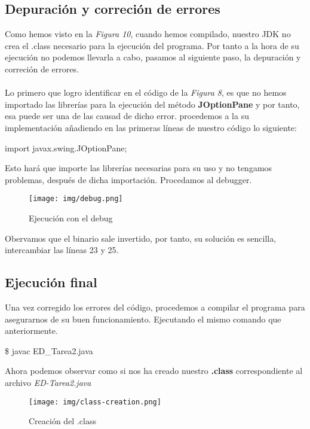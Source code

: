 \documentclass{article}
\begin{document}
    \subsection{Depuración y correción de errores}
      Como hemos visto en la \textit{Figura 10}, cuando hemos compilado, nuestro JDK no crea el .class necesario para la ejecución del programa. Por tanto a la hora de su
      ejecución no podemos llevarla a cabo, pasamos al siguiente paso, la depuración y correción de errores.
      \\\\
      Lo primero que logro identificar en el código de la \textit{Figura 8}, es que no hemos importado las librerías para la ejecución del método 
      \textbf{JOptionPane} y por tanto, esa puede ser una de las causad de dicho error. procedemos a la su implementación añadiendo en las primeras líneas de nuestro código 
      lo siguiente:
      \begin{listing}[style = C]
        import javax.swing.JOptionPane;
      \end{listing}
      Esto hará que importe las librerías necesarias para su uso y no tengamos problemas, después de dicha importación. Procedamos al debugger.

      \begin{figure}[h]
        \centering
        \texttt{[image: img/debug.png]}
        \caption{Ejecución con el debug}
      \end{figure}

      Obervamos que el binario sale invertido, por tanto, su solución es sencilla, intercambiar las líneas 23 y 25.

  \newpage
    \subsection{Ejecución final}
      Una vez corregido los errores del código, procedemos a compilar el programa para asegurarnos de su buen funcionamiento.
      Ejecutando el mismo comando que anteriormente.
      \begin{listing}[style=consola, numbers=none]
        \$ javac ED_Tarea2.java 
        \end{listing}
      Ahora podemos observar como si nos ha creado nuestro \textbf{.class} correspondiente al archivo \textit{ED-Tarea2.java}
      \begin{figure}[h]
        \centering
        \texttt{[image: img/class-creation.png]}
        \caption{Creación del .class}
      \end{figure}
\end{document}
